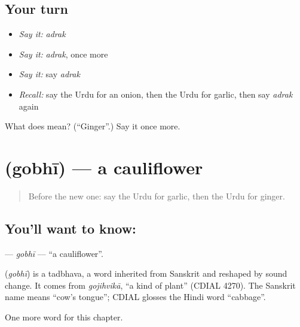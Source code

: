 \subsection*{Your turn}
\begin{itemize}
\raggedright
  \item \emph{Say it:} \emph{adrak}
  \item \emph{Say it:} \emph{adrak}, once more
  \item \emph{Say it:} say \emph{adrak}
  \item \emph{Recall:} say the Urdu for an onion, then the Urdu for garlic, then say \emph{adrak} again
\end{itemize}

\begin{tcolorbox}[breakable,colback=teal!4,colframe=teal!35!black,title={Before you move on}]
What does  mean? (\textquotedblleft{}Ginger\textquotedblright{}.) Say it once more.
\end{tcolorbox}
\section[\texorpdfstring{\ur{گوبھی} (gobhī)}{گوبھی (gobhī)}]{ (gobhī) — a cauliflower}

\label{lesson:UR-C115-gobhi}



\begin{quote}
Before the new one: say the Urdu for garlic, then the Urdu for ginger.
\end{quote}

\subsection*{You'll want to know: }
\textbf{} — \emph{gobhī} — \textquotedblleft{}a cauliflower\textquotedblright{}.

\begin{cousinweb}
\textbf{} (\emph{gobhī}) is a tadbhava, a word inherited from Sanskrit and reshaped by sound change. It comes from \emph{gojihvikā}, \textquotedblleft{}a kind of plant\textquotedblright{} (CDIAL 4270). The Sanskrit name means \textquotedblleft{}cow's tongue\textquotedblright{}; CDIAL glosses the Hindi word \textquotedblleft{}cabbage\textquotedblright{}.
\end{cousinweb}

\begin{grammarlens}[title={What you've built}]
One more word for this chapter.
\end{grammarlens}

